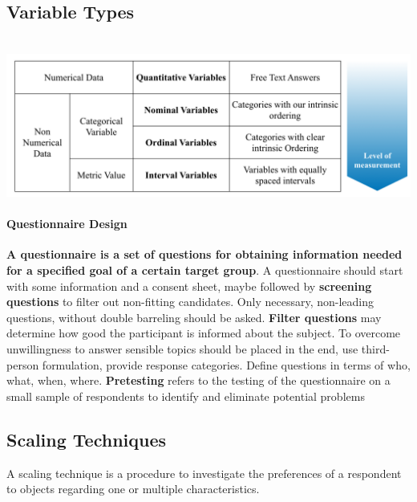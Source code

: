 \documentclass[11pt]{article}
\begin{document}
    \subsection{Variable Types} \\
    \includegraphics{assets/variable-types.png}

    \paragraph{Questionnaire Design} \textbf{A questionnaire is a set of questions for obtaining information needed for a specified goal of a certain target group}. A questionnaire should start with some information and a consent sheet, maybe followed by \textbf{screening questions} to filter out non-fitting candidates. Only necessary, non-leading questions, without double barreling should be asked. \textbf{Filter questions} may determine how good the participant is informed about the subject. To overcome unwillingness to answer sensible topics should be placed in the end, use third-person formulation, provide response categories. Define questions in terms of who, what, when, where. \textbf{Pretesting} refers to the testing of the questionnaire on a small sample of respondents to identify and eliminate potential problems

    \subsection{Scaling Techniques} 
    
    A scaling technique is a procedure to investigate the preferences of a respondent to objects regarding one or multiple characteristics.
\end{document}
